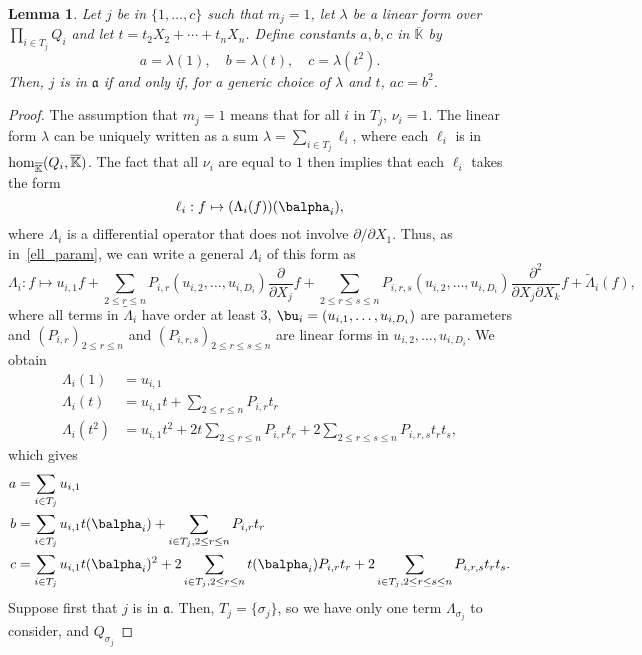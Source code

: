 \documentclass[12pt]{article}
\newtheorem{Lemma}{Lemma}
\def\Kbar {{\ensuremath{\overline{\mathbb{K}}}}}
\begin{document}
\begin{Lemma}\label{lemma:acb2}
	Let $j$ be in $\{1,\dots,c\}$ such that $m_j=1$, let $\lambda$ be a
	linear form over $\prod_{i \in T_j} Q_i$ and let $t=t_2 X_2
	+ \cdots + t_n X_n$. Define constants $a,b,c$ in $\Kbar$ by
	$$a=\lambda(1),\quad b=\lambda(t),\quad c=\lambda(t^2).$$
	Then, $j$ is in $\mathfrak{a}$
	if and only if, for a generic choice of $\lambda$ and $t$, $ac=b^2$.
\end{Lemma}
\begin{proof}
	The assumption that $m_j=1$ means that for all $i$ in $T_j$,
	$\nu_i=1$. The linear 
	form $\lambda$ can be uniquely written as a sum $\lambda=\sum_{i \in T_j}
	\ell_i$, where each $\ell_i$ is in ${\rm hom}_\Kbar(Q_i,\Kbar)$.
	The fact that all $\nu_i$ are equal to $1$ then implies that each $\ell_i$ takes the form 
	$$\ell_i: f \mapsto (\Lambda_{i}(f))(\balpha_i),$$
	where $\Lambda_{i}$ is a differential operator that does not 
	involve $\partial/\partial X_1$. Thus, as in~\eqref{ell_param}, we can write a general
	$\Lambda_i$ of this form as
	$$\Lambda_i: f \mapsto u_{i,1} f + \sum_{2 \le r \le n}
	P_{i,r}(u_{i,2},\dots,u_{i,D_i}) \frac{\partial}{\partial X_j} f +
	\sum_{2 \le r \le s \le n} P_{i,r,s}(u_{i,2},\dots,u_{i,D_i})
	\frac{\partial^2}{\partial X_j\partial X_k} f +
	\tilde\Lambda_i(f),$$ where all terms in $\tilde \Lambda_i$ have
	order at least $3$, $\bu_i=(u_{i,1},\dots,u_{i,D_i})$ are parameters and
	$(P_{i,r})_{2 \le r \le n}$ and $(P_{i,r,s})_{2 \le r \le s \le n}$
	are linear forms in $u_{i,2},\dots,u_{i,D_i}$.
	We obtain
	\begin{align*}
	\Lambda_i(1)   &= u_{i,1} \\
	\Lambda_i(t)   &= u_{i,1} t +\sum_{2 \le r \le n}P_{i,r}t_r \\
	\Lambda_i(t^2) &= u_{i,1} t^2  +2 t \sum_{2 \le r \le n}P_{i,r}t_r   
	+ 2\sum_{2 \le r \le s \le n} P_{i,r,s}t_rt_s,
	\end{align*}
	which gives
	\begin{align*}
	a  &= \sum_{i\in T_j}u_{i,1} \\
	b  &= \sum_{i\in T_j}u_{i,1} t(\balpha_i) +\sum_{i \in T_j, 2 \le r \le n}P_{i,r}t_r \\
	c &= \sum_{i\in T_j}u_{i,1} t(\balpha_i)^2  +2  \sum_{i \in T_j, 2 \le r \le n}t(\balpha_i) P_{i,r}t_r    
	+2 \sum_{i \in T_j, 2 \le r \le s \le n} P_{i,r,s}t_rt_s.
	\end{align*}
	Suppose first that $j$ is in $\mathfrak{a}$. Then, $T_j=\{\sigma_j\}$, so we 
	have only one term $\Lambda_{\sigma_j}$ to consider, and $Q_{\sigma_j}$ 

\end{proof}
\end{document}
